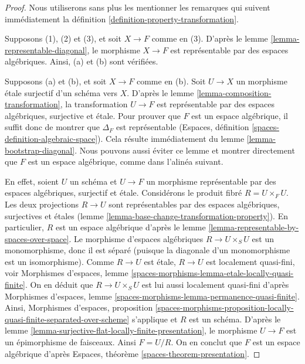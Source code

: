 \begin{proof}
Nous utiliserons sans plus les mentionner les remarques qui suivent immédiatement la
définition \ref{definition-property-transformation}.

\medskip\noindent
Supposons (1), (2) et (3), et soit $X \to F$ comme en (3).
D'après le lemme \ref{lemma-representable-diagonal}, le morphisme
$X \to F$ est représentable par des espaces algébriques. Ainsi,
(a) et (b) sont vérifiées.

\medskip\noindent
Supposons (a) et (b), et soit $X \to F$ comme en (b).
Soit $U \to X$ un morphisme étale surjectif d'un schéma vers $X$.
D'après le lemme \ref{lemma-composition-transformation}, la transformation
$U \to F$ est représentable par des espaces algébriques, surjective et étale.
Pour prouver que $F$ est un espace algébrique, il suffit donc de montrer que
$\Delta_F$ est représentable (Espaces, définition
\ref{spaces-definition-algebraic-space}). Cela résulte immédiatement du
lemme \ref{lemma-bootstrap-diagonal}.
Nous pouvons aussi éviter ce lemme et montrer directement que $F$
est un espace algébrique, comme dans l'alinéa suivant.

\medskip\noindent
En effet, soient $U$ un schéma et $U \to F$ un morphisme représentable par des espaces
algébriques, surjectif et étale. Considérons le produit fibré $R = U \times_F U$.
Les deux projections $R \to U$ sont représentables par des espaces algébriques, surjectives
et étales (lemme \ref{lemma-base-change-transformation-property}).
En particulier, $R$ est un espace algébrique d'après le
lemme \ref{lemma-representable-by-spaces-over-space}.
Le morphisme d'espaces algébriques $R \to U \times_S U$ est un monomorphisme,
donc il est séparé (puisque la diagonale d'un monomorphisme est un isomorphisme).
Comme $R \to U$ est étale, $R \to U$ est localement quasi-fini, voir
Morphismes d'espaces,
lemme \ref{spaces-morphisms-lemma-etale-locally-quasi-finite}.
On en déduit que $R \to U \times_S U$ est lui aussi
localement quasi-fini d'après
Morphismes d'espaces,
lemme \ref{spaces-morphisms-lemma-permanence-quasi-finite}.
Ainsi,
Morphismes d'espaces, proposition
\ref{spaces-morphisms-proposition-locally-quasi-finite-separated-over-scheme}
s'applique et $R$ est un schéma. D'après le
lemme \ref{lemma-surjective-flat-locally-finite-presentation},
le morphisme $U \to F$ est un épimorphisme de faisceaux. Ainsi $F = U/R$.
On en conclut que $F$ est un espace algébrique d'après
Espaces, théorème \ref{spaces-theorem-presentation}.
\end{proof}









